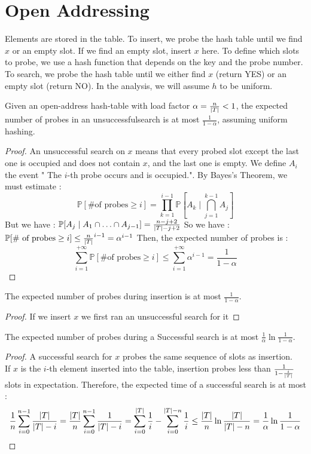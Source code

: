 \documentclass{cours}
\begin{document}
\section{Open Addressing}
Elements are stored in the table. To insert, we probe the hash table until we find $x$ or an empty slot. If we find an empty slot, insert $x$ here. To define which slots to probe, we use a hash function that depends on the key and the probe number. To search, we probe the hash table until we either find $x$ (return YES) or an empty slot (return NO). In the analysis, we will assume $h$ to be uniform.

\begin{theorem}[Analysis]
    Given an open-address hash-table with load factor $\alpha = \frac{n}{\left|T\right|} < 1$, the expected number of probes in an unsuccessfulsearch is at most $\frac{1}{1-\alpha}$, assuming uniform hashing.
\end{theorem}
\begin{proof}
    An unsuccessful search on $x$ means that every probed slot except the last one is occupied and does not contain $x$, and the last one is empty.
    We define $A_{i}$ the event " The $i$-th probe occurs and is occupied.". By Bayes's Theorem, we must estimate :
    \[
        \mathbb{P}[\text{\# of probes} \geq i] = \prod_{k = 1}^{i - 1} \mathbb{P}[A_{k} \mid \bigcap\limits_{j = 1}^{k - 1} A_{j}]
    \]
    But we have : $\mathbb{P}[A_{j}\mid A_{1} \cap \ldots \cap A_{j - 1}] = \frac{n - j + 2}{\left|T\right| - j + 2}$
    So we have : $\mathbb{P}[\text{\# of probes} \geq i] \leq \frac{n}{\left|T\right|}^{i - 1} = \alpha^{i - 1}$
    Then, the expected number of probes is :
    \[
        \sum_{i = 1}^{+\infty} \mathbb{P}[\text{\# of probes} \geq i] \leq \sum_{i = 1}^{+\infty} \alpha^{i - 1} = \frac{1}{1 - \alpha}
    \]
\end{proof}
\begin{corollary}
    The expected number of probes during insertion is at most $\frac{1}{1 - \alpha}$.
\end{corollary}
\begin{proof}
    If we insert $x$ we first ran an unsuccessful search for it
\end{proof}

\begin{theorem}
    The expected number of probes during a Successful search is at most $\frac{1}{\alpha}\ln\frac{1}{1- \alpha}$.
\end{theorem}
\begin{proof}
    A successful search for $x$ probes the same sequence of slots as insertion.\\
    If $x$ is the $i$-th element inserted into the table, insertion probes less than $\frac{1}{1 - \frac{i}{\left|T\right|}}$ slots in expectation.
    Therefore, the expected time of a successful search is at most :
    \[
        \frac{1}{n}\sum_{i = 0}^{n - 1}\frac{\left|T\right|}{\left|T\right| - i} = \frac{\left|T\right|}{n}\sum_{i = 0}^{n - 1}\frac{1}{\left|T\right| - i} = \sum_{i = 0}^{\left|T\right|}\frac{1}{i} - \sum_{i = 0}^{\left|T\right|-n} \frac{1}{i} \leq \frac{\left|T\right|}{n}\ln\frac{\left|T\right|}{\left|T\right| - n} = \frac{1}{\alpha}\ln\frac{1}{1 - \alpha}
    \]
\end{proof}
\end{document}
